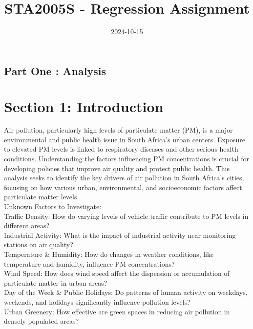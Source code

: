 \documentclass[12pt,halfline,a4paper,]{ouparticle}
\begin{document}
\title{STA2005S - Regression Assignment}

\author{%
%
%
%
%
%
%
%
%
%
\and
{}
%
%
%
%
%
%
}

\abstract{}

\date{2024-10-15}

\keywords{}

\maketitle



\newpage

\subsection{Part One : Analysis}\label{part-one-analysis}

\section{Section 1: Introduction}\label{section-1-introduction}

Air pollution, particularly high levels of particulate matter (PM), is a
major environmental and public health issue in South Africa's urban
centers. Exposure to elevated PM levels is linked to respiratory
diseases and other serious health conditions. Understanding the factors
influencing PM concentrations is crucial for developing policies that
improve air quality and protect public health. This analysis seeks to
identify the key drivers of air pollution in South Africa's cities,
focusing on how various urban, environmental, and socioeconomic factors
affect particulate matter levels.\\
Unknown Factors to Investigate:\\
Traffic Density: How do varying levels of vehicle traffic contribute to
PM levels in different areas?\\
Industrial Activity: What is the impact of industrial activity near
monitoring stations on air quality?\\
Temperature \& Humidity: How do changes in weather conditions, like
temperature and humidity, influence PM concentrations?\\
Wind Speed: How does wind speed affect the dispersion or accumulation of
particulate matter in urban areas?\\
Day of the Week \& Public Holidays: Do patterns of human activity on
weekdays, weekends, and holidays significantly influence pollution
levels?\\
Urban Greenery: How effective are green spaces in reducing air pollution
in densely populated areas?
\end{document}
